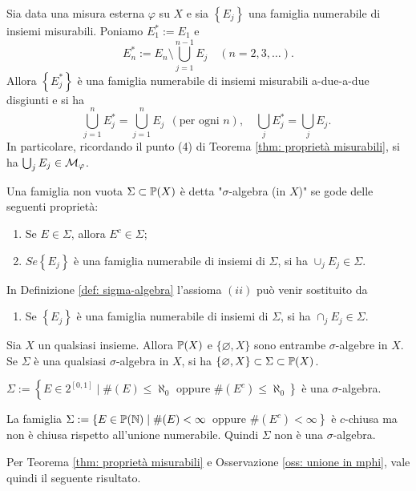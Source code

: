 \begin{remark}\label{oss: unione in mphi} Sia data una misura esterna $\varphi$ su $X$ e sia $\left\{E_{j}\right\}$ una famiglia numerabile di insiemi misurabili. Poniamo $E_{1}^{*}:=E_{1}$ e
\[
E_{n}^{*}:=E_{n}\setminus \bigcup_{j=1}^{n-1} E_{j} \quad(n=2,3, \ldots) .
\]
Allora $\left\{E_{j}^{*}\right\}$ è una famiglia numerabile di insiemi misurabili a-due-a-due disgiunti e si ha
\[
\bigcup_{j=1}^{n} E_{j}^{*}=\bigcup_{j=1}^{n} E_{j}\ \ (\text {per ogni } n), \quad \bigcup_{j} E_{j}^{*}=\bigcup_{j} E_{j} \text {. }
\]
In particolare, ricordando il punto (4) di Teorema \ref{thm: proprietà misurabili}, si ha $\bigcup_{j} E_{j} \in \mc{M}_{\varphi}$.
\end{remark}
\begin{definition} \label{def: sigma-algebra} Una famiglia non vuota $\Sigma \subset \P(X)$ è detta "$\sigma$-algebra (in $X$)" se gode delle seguenti proprietà:
\begin{enumerate}[label=$(\roman*)$]
  \item Se $E \in \Sigma$, allora $E^{c} \in \Sigma$;
  \item $S e\left\{E_{j}\right\}$ è una famiglia numerabile di insiemi di $\Sigma$, si ha $\cup_{j} E_{j} \in \Sigma$.
\end{enumerate}
\end{definition}
\begin{remark}In Definizione \ref{def: sigma-algebra} l'assioma $(ii)$ può venir sostituito da
\begin{enumerate}[label=$(\roman*^*$), start=2]
  \item Se $\left\{E_{j}\right\}$ è una famiglia numerabile di insiemi di $\Sigma$, si ha $\cap_{j} E_{j} \in \Sigma$.
\end{enumerate}
\end{remark}
\begin{example}Sia $X$ un qualsiasi insieme. Allora $\P(X)$ e $\{\varnothing, X\}$ sono entrambe $\sigma$-algebre in $X$. Se $\Sigma$ è una qualsiasi $\sigma$-algebra in $X$, si ha $\{\varnothing, X\} \subset \Sigma \subset \P(X)$.
\end{example}

\begin{example}$\Sigma:=\left\{E \in 2^{[0,1]} \mid \#(E) \leq \aleph_{0}\right.$ oppure $\left.\#\left(E^{c}\right) \leq \aleph_{0}\right\}$ è una $\sigma$-algebra.
\end{example}
\begin{example}La famiglia $\Sigma:=\left\{E \in \P(\N) \mid \#(E)<\infty\right.$ oppure $\left.\#\left(E^{c}\right)<\infty\right\}$ è $c$-chiusa ma non è chiusa rispetto all'unione numerabile. Quindi $\Sigma$ non è una $\sigma$-algebra.
\end{example}
Per Teorema \ref{thm: proprietà misurabili} e Osservazione \ref{oss: unione in mphi}, vale quindi il seguente risultato.

